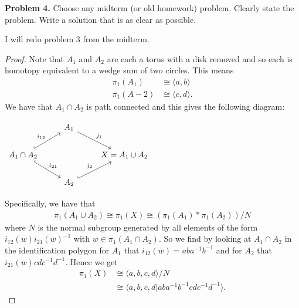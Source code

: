 \documentclass[leqno]{article}
\theoremstyle{nonumberplain}
\newtheorem{proof}{Proof}
\begin{document}
\vspace*{1cm}


\noindent\textbf{Problem 4.} Choose any midterm (or old homework) problem. Clearly state the problem. Write a solution that is as clear as possible.

I will redo problem 3 from the midterm.

\begin{proof}
Note that $A_1$ and $A_2$ are each a torus with a disk removed and so each is homotopy equivalent to a wedge sum of two circles. This means
\begin{align*}
\pi_1(A_1) &\cong \langle a, b \rangle\\
\pi_1(A-2) &\cong \langle c,d \rangle.
\end{align*}
We have that $A_1 \cap A_2$ is path connected and this gives the following diagram:
\begin{center}
$
\begin{tikzcd}
 & A_1 \arrow[rd, "j_1"] &  \\
A_1 \cap A_2 \arrow[ru, "i_{12}", hook] \arrow[rd, "i_{21}", hook] &  & X=A_1 \cup A_2 \\
 & A_2 \arrow[ru, "j_2", hook] & 
\end{tikzcd}
$
\end{center}
Specifically, we have that
\begin{align*}
\pi_1(A_1 \cup A_2) \cong \pi_1(X) \cong (\pi_1(A_1)\ast \pi_1(A_2))/N
\end{align*}
where $N$ is the normal subgroup generated by all elements of the form $i_{12}(w)i_{21}(w)^{-1}$ with $w\in \pi_1(A_1 \cap A_2)$. So we find by looking at $A_1 \cap A_2$ in the identification polygon for $A_1$ that $i_{12}(w)=aba^{-1}b^{-1}$ and for $A_2$ that $i_{21}(w)cdc^{-1}d^{-1}$. Hence we get
\begin{align*}
\pi_1(X)&\cong \langle a,b,c, d \rangle / N\\
&\cong \langle a,b,c,d \vert aba^{-1}b^{-1}cdc^{-1}d^{-1} \rangle.
\end{align*}
\end{proof}
\end{document}
